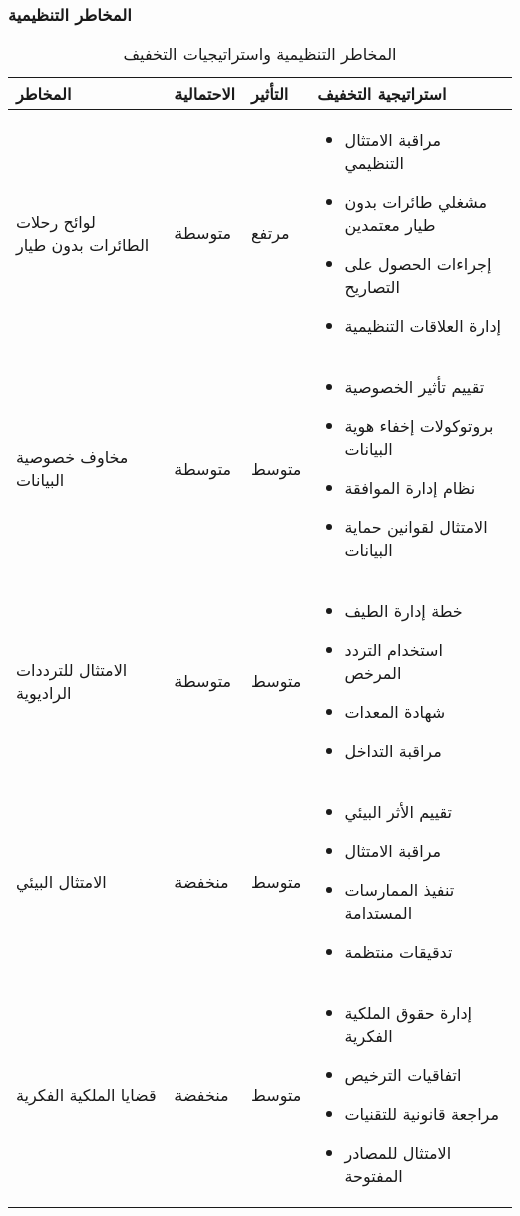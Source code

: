 \subsubsection{المخاطر التنظيمية}
\begin{table}[H]
\centering
\begin{tabular}{|p{3cm}|p{2cm}|p{2cm}|p{7cm}|}
\hline
\textbf{المخاطر} & \textbf{الاحتمالية} & \textbf{التأثير} & \textbf{استراتيجية التخفيف} \\
\hline
لوائح رحلات الطائرات بدون طيار & متوسطة & مرتفع & 
\begin{itemize}
    \item مراقبة الامتثال التنظيمي
    \item مشغلي طائرات بدون طيار معتمدين
    \item إجراءات الحصول على التصاريح
    \item إدارة العلاقات التنظيمية
\end{itemize} \\
\hline
مخاوف خصوصية البيانات & متوسطة & متوسط & 
\begin{itemize}
    \item تقييم تأثير الخصوصية
    \item بروتوكولات إخفاء هوية البيانات
    \item نظام إدارة الموافقة
    \item الامتثال لقوانين حماية البيانات
\end{itemize} \\
\hline
الامتثال للترددات الراديوية & متوسطة & متوسط & 
\begin{itemize}
    \item خطة إدارة الطيف
    \item استخدام التردد المرخص
    \item شهادة المعدات
    \item مراقبة التداخل
\end{itemize} \\
\hline
الامتثال البيئي & منخفضة & متوسط & 
\begin{itemize}
    \item تقييم الأثر البيئي
    \item مراقبة الامتثال
    \item تنفيذ الممارسات المستدامة
    \item تدقيقات منتظمة
\end{itemize} \\
\hline
قضايا الملكية الفكرية & منخفضة & متوسط & 
\begin{itemize}
    \item إدارة حقوق الملكية الفكرية
    \item اتفاقيات الترخيص
    \item مراجعة قانونية للتقنيات
    \item الامتثال للمصادر المفتوحة
\end{itemize} \\
\hline
\end{tabular}
\caption{المخاطر التنظيمية واستراتيجيات التخفيف}
\end{table}

